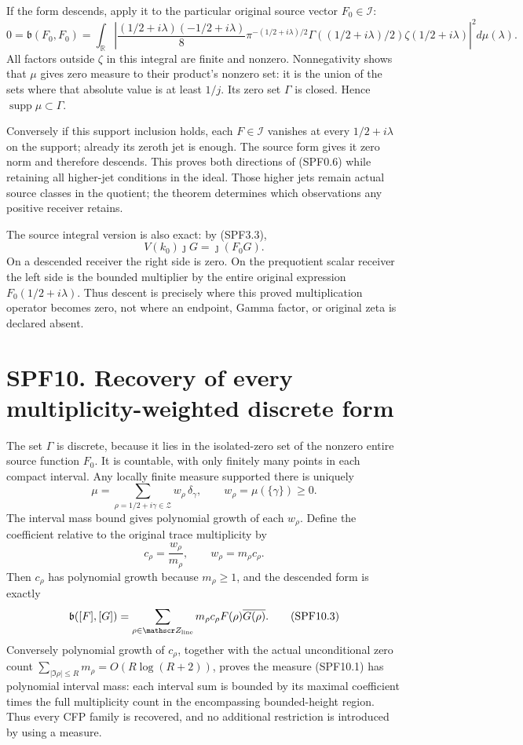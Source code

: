 If the form descends, apply it to the particular original source vector
\(F_0\in\mathcal I\): \[
0=\mathfrak b(F_0,F_0)
=\int_{\mathbb R}
\left|\frac{(1/2+i\lambda)(-1/2+i\lambda)}8
\pi^{-(1/2+i\lambda)/2}
\Gamma((1/2+i\lambda)/2)\zeta(1/2+i\lambda)\right|^2d\mu(\lambda).
\tag{SPF9.1}
\] All factors outside \(\zeta\) in this integral are finite and
nonzero. Nonnegativity shows that \(\mu\) gives zero measure to their
product's nonzero set: it is the union of the sets where that absolute
value is at least \(1/j\). Its zero set \(\Gamma\) is closed. Hence
\(\operatorname{supp}\mu\subset\Gamma\).

Conversely if this support inclusion holds, each \(F\in\mathcal I\)
vanishes at every \(1/2+i\lambda\) on the support; already its zeroth
jet is enough. The source form gives it zero norm and therefore
descends. This proves both directions of (SPF0.6) while retaining all
higher-jet conditions in the ideal. Those higher jets remain actual
source classes in the quotient; the theorem determines which
observations any positive receiver retains.

The source integral version is also exact: by (SPF3.3), \[
V(k_0)\jmath G=\jmath(F_0G).
\tag{SPF9.2}
\] On a descended receiver the right side is zero. On the prequotient
scalar receiver the left side is the bounded multiplier by the entire
original expression \(F_0(1/2+i\lambda)\). Thus descent is precisely
where this proved multiplication operator becomes zero, not where an
endpoint, Gamma factor, or original zeta is declared absent.

\section{SPF10. Recovery of every multiplicity-weighted discrete
form}\label{spf10.-recovery-of-every-multiplicity-weighted-discrete-form}

The set \(\Gamma\) is discrete, because it lies in the isolated-zero set
of the nonzero entire source function \(F_0\). It is countable, with
only finitely many points in each compact interval. Any locally finite
measure supported there is uniquely \[
\mu=\sum_{\rho=1/2+i\gamma\in\mathscr Z}
w_\rho\,\delta_\gamma,
\qquad w_\rho=\mu(\{\gamma\})\ge0.
\tag{SPF10.1}
\] The interval mass bound gives polynomial growth of each \(w_\rho\).
Define the coefficient relative to the original trace multiplicity by \[
c_\rho=\frac{w_\rho}{m_\rho},\qquad
w_\rho=m_\rho c_\rho.
\tag{SPF10.2}
\] Then \(c_\rho\) has polynomial growth because \(m_\rho\ge1\), and the
descended form is exactly \[
\mathfrak b([F],[G])=
\sum_{\rho\in\mathscr Z_{\rm line}}m_\rho c_\rho
F(\rho)\overline{G(\rho)}.
\tag{SPF10.3}
\] Conversely polynomial growth of \(c_\rho\), together with the actual
unconditional zero count \(\sum_{|\Im\rho|\le R}m_\rho=O(R\log(R+2))\),
proves the measure (SPF10.1) has polynomial interval mass: each interval
sum is bounded by its maximal coefficient times the full multiplicity
count in the encompassing bounded-height region. Thus every CFP family
is recovered, and no additional restriction is introduced by using a
measure.

